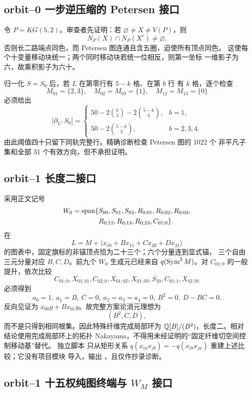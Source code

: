 \subsection{orbit--0 一步逆压缩的 Petersen 接口}

令 \(P=KG(5,2)\)。审查者先证明：若
\(\varnothing\ne X\ne V(P)\)，则
\[
N_P(X)\cap N_P(X^c)\ne\varnothing.
\]
否则长二路端点同色，而 Petersen 图连通且含五圈，迫使所有顶点同色。
这使每个十变量移动块统一；两个同时移动块若统一位相反，则第一坐标
一维影子为六，故乘积影子为六十。

归一化 \(S=S_0\) 后，若 \(L\) 在第零行有 \(5-k\) 格、在第 \(b\) 行
有 \(k\) 格，逐个检查
\[
M_{01}=\{2,3\},\quad
M_{02}=M_{03}=\{1\},\quad
M_{12}=M_{13}=\{0\}
\]
必须给出
\[
|\partial_{L^\perp}S_0|=
\begin{cases}
50-2\binom{k}{3}-2\binom{5-k}{3},&b=1,\\
50-2\binom{5-k}{3},&b=2,3,4.
\end{cases}
\]
由此阈值四十只留下同轨完整行。精确诊断检查 Petersen 图的 1022 个
非平凡子集和全部 31 个有效方向，但不承担证明。

\subsection{orbit--1 长度二接口}

采用正文记号
\[
\begin{aligned}
W_0=\operatorname{span}\{&
S_{00},S_{01},S_{02},R_{0;01},R_{0;02},R_{0;03},\\
&R_{0;12},R_{0;13},R_{0;23},C_{01;0}\}.
\end{aligned}
\]
在
\[
L=M+\langle x_{10}+Bx_{11}+Cx_{20}+Dx_{21}\rangle
\]
的图表中，固定旗标的非锚顶点恰为二十三个；六个分量连到显式锚，
三个自由三元分量对应 \(B,C,D\)。前九个 \(W_0\) 生成元已经来自
\(q(\operatorname{Sym}^2M)\)。对 \(C_{01;0}\) 的一般提升，依次比较
\[
C_{01;0},X_{01;01},C_{02;0},X_{01;02},X_{01;03},S_{10},
C_{01;1},X_{02;01}
\]
必须得到
\[
a_0=1,\ a_1=B,\ C=0,\ a_2=a_3=a_4=0,\ B^2=0,\ D-BC=0.
\]
反向见证为 \(x_{00}y+Bx_{01}y\)。故完整方案论消元理想为
\[
(B^2,C,D),
\]
而不是只得到相同根集。因此特殊纤维完成局部环为
\(\mathbb Q[B]/(B^2)\)，长度二。相对结论使用完成局部环上的拓扑
Nakayama，不得用未经证明的“固定纤维切空间控制移动基”替代。
独立脚本
只从矩形关系
\(q(x_{ia}x_{jb})=-q(x_{ib}x_{ja})\) 重建上述比较；它没有项目模块
导入，输出
，且仅作抄录诊断。

\subsection{orbit--1 十五权纯图终端与 \(W_M\) 接口}

